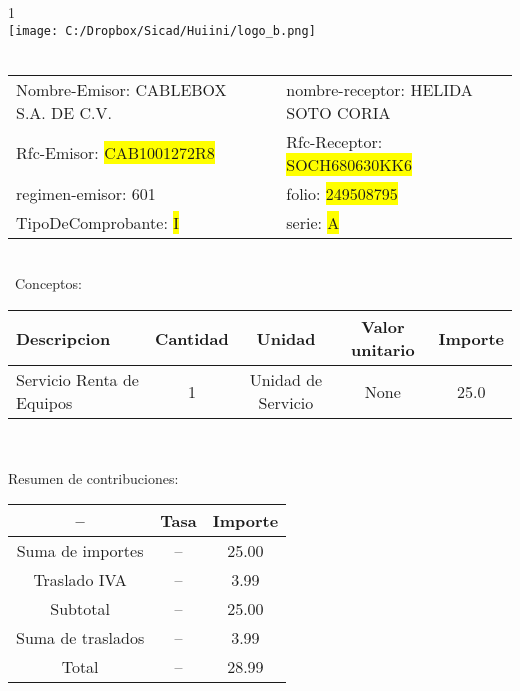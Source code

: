 \documentclass{article}
\begin{document}
\hspace{18cm} 1\\
\texttt{[image: C:/Dropbox/Sicad/Huiini/logo\_b.png]}
\bigskip\\\
\begin{tabular}{p{11cm}p{1cm}p{8cm}}

Nombre-Emisor: CABLEBOX S.A. DE C.V. && nombre-receptor: HELIDA SOTO CORIA \\

Rfc-Emisor: \colorbox{yellow}{ CAB1001272R8 } & & Rfc-Receptor: \colorbox{yellow}{ SOCH680630KK6 }\\

regimen-emisor: 601 & & folio: \colorbox{yellow}{ 249508795 }\\

TipoDeComprobante: \colorbox{yellow}{ I } & & serie: \colorbox{yellow}{ A }\\



\end{tabular}
\bigskip\bigskip\bigskip\\\
Conceptos:\\
\begin{tabular}{|p{10cm}|c|c|c|c|}
\hline
Descripcion & Cantidad & Unidad & Valor unitario & Importe\\
\hline

Servicio Renta de Equipos & 1 & Unidad de Servicio & None & 25.0 \\
\hline

\end{tabular}\\
\bigskip
\begin{center}
Resumen de contribuciones:\\
\bigskip
\begin{tabular}{|c|c|c|}
\hline
 -- & Tasa & Importe\\
\hline

Suma de importes & -- & 25.00 \\
\hline

Traslado IVA & -- & 3.99 \\
\hline

Subtotal  & -- & 25.00 \\
\hline

Suma de traslados & -- & 3.99 \\
\hline

Total  & -- & 28.99 \\
\hline

\end{tabular}
\end{center}
\end{document}
